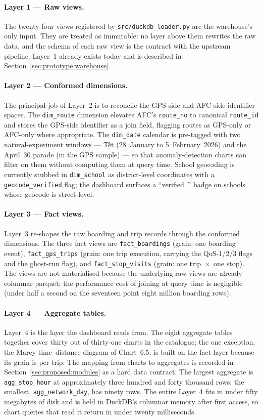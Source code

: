 \paragraph{Layer 1 --- Raw views.}
The twenty-four views registered by
\texttt{src/duckdb\_loader.py} are the warehouse's only input.
They are treated as immutable: no layer above them rewrites the
raw data, and the schema of each raw view is the contract with
the upstream pipeline. Layer~1 already exists today and is
described in Section~\ref{sec:prototype:warehouse}.

\paragraph{Layer 2 --- Conformed dimensions.}
The principal job of Layer~2 is to reconcile the GPS-side and
AFC-side identifier spaces. The \texttt{dim\_route} dimension
elevates AFC's \texttt{route\_no} to canonical \texttt{route\_id}
and stores the GPS-side identifier as a join field, flagging
routes as GPS-only or AFC-only where appropriate. The
\texttt{dim\_date} calendar is pre-tagged with two
natural-experiment windows --- T\d ết (28~January to
5~February~2026) and the April~30 parade (in the GPS sample) ---
so that anomaly-detection charts can filter on them without
computing them at query time. School geocoding is currently
stubbed in \texttt{dim\_school} as district-level coordinates
with a \texttt{geocode\_verified} flag; the dashboard surfaces a
``verified~\checkmark'' badge on schools whose geocode is
street-level.

\paragraph{Layer 3 --- Fact views.}
Layer~3 re-shapes the raw boarding and trip records through the
conformed dimensions. The three fact views are
\texttt{fact\_boardings} (grain: one boarding event),
\texttt{fact\_gps\_trips} (grain: one trip execution, carrying
the QoS-1/2/3 flags and the ghost-run flag), and
\texttt{fact\_stop\_visits} (grain: one trip~$\times$~one
stop). The views are not materialised because the underlying raw
views are already columnar parquet; the performance cost of
joining at query time is negligible (under half a second on the
seventeen point eight million boarding rows).

\paragraph{Layer 4 --- Aggregate tables.}
Layer~4 is the layer the dashboard reads from. The eight
aggregate tables together cover thirty out of thirty-one charts
in the catalogue; the one exception, the Marey time--distance
diagram of Chart~6.5, is built on the fact layer because its
grain is per-trip. The mapping from charts to aggregates is
recorded in Section~\ref{sec:proposed:modules} as a hard data
contract. The largest aggregate is \texttt{agg\_stop\_hour} at
approximately three hundred and forty thousand rows; the
smallest, \texttt{agg\_network\_day}, has ninety rows. The
entire Layer~4 fits in under fifty megabytes of disk and is held
in DuckDB's columnar memory after first access, so chart queries
that read it return in under twenty milliseconds.

